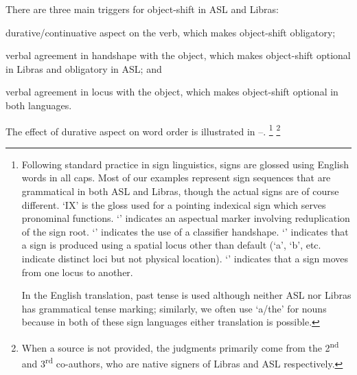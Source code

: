\documentclass[output=paper]{langscibook}
\begin{document}
There are three main triggers for object-shift in ASL and
Libras: 
\begin{inparaenum}[1.]
    \item durative/continuative aspect on the verb, which makes object-shift obligatory; 
    \item verbal agreement in handshape with the object, which makes object-shift 
    optional in Libras and obligatory in ASL; and 
    \item verbal agreement in locus with the object, which makes object-shift optional in both languages. 
\end{inparaenum}
The effect of durative aspect on word order is illustrated in --.%
\footnote{
    Following standard practice in sign linguistics, signs are glossed using
    English words in all caps. Most of our examples represent sign sequences that are
    grammatical in both ASL and Libras, though the actual signs are of course different.
    `IX' is the gloss used for a pointing indexical sign which serves
    pronominal functions. `\laszAsp{}' indicates an aspectual marker involving reduplication
    of the sign root. `\laszHs{\_}' indicates the use of a classifier handshape. `\laszLoc{\_}'
    indicates that a sign is produced using a spatial locus other than default (`a', `b',
    etc. indicate distinct loci but not physical location). `\laszDir{\_}{\_}' indicates that a sign
    moves from one locus to another. \par 
    In the English translation, past tense is used although neither ASL nor
    Libras has grammatical tense marking; similarly, we often use `a/the' for nouns
    because in both of these sign languages either translation is possible.
}%
\footnote{When a source is not provided, the judgments primarily come from the
    2\textsuperscript{nd} and 3\textsuperscript{rd} co-authors, who are native signers of Libras and ASL respectively.
}
\ea
    \label{lasz:ex:1}
    \z 
\ex
    \label{lasz:ex:2}
\end{document}
